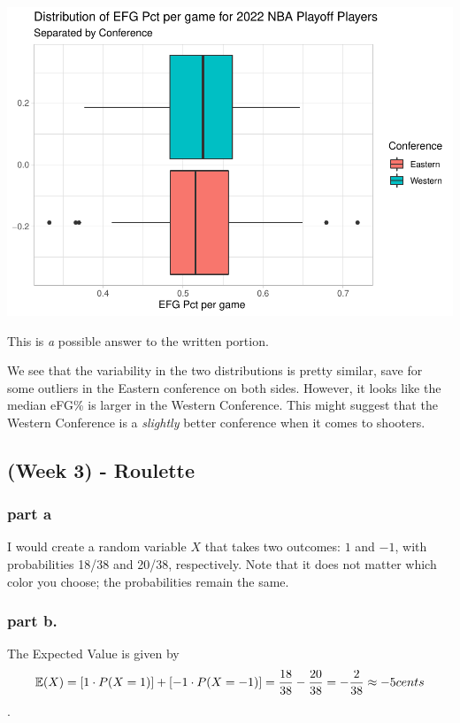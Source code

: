 \documentclass[
]{article}
\begin{document}
\includegraphics{Monday-Lab-Worksheet-Answers_files/figure-latex/unnamed-chunk-17-1.pdf}

This is \emph{a} possible answer to the written portion.

We see that the variability in the two distributions is pretty similar,
save for some outliers in the Eastern conference on both sides. However,
it looks like the median eFG\% is larger in the Western Conference. This
might suggest that the Western Conference is a \emph{slightly} better
conference when it comes to shooters.

\hypertarget{week-3---roulette}{%
\subsection{(Week 3) - Roulette}\label{week-3---roulette}}

\hypertarget{part-a-1}{%
\subsubsection{part a}\label{part-a-1}}

I would create a random variable \(X\) that takes two outcomes: \(1\)
and \(-1\), with probabilities 18/38 and 20/38, respectively. Note that
it does not matter which color you choose; the probabilities remain the
same.

\hypertarget{part-b.}{%
\subsubsection{part b.}\label{part-b.}}

The Expected Value is given by
\[ \mathbb{E}(X) = [1 \cdot P(X=1)] + [-1 \cdot P(X = -1)]  = \frac{18}{38} - \frac{20}{38} = -\frac{2}{38} \approx -5 \space cents\].
\end{document}
